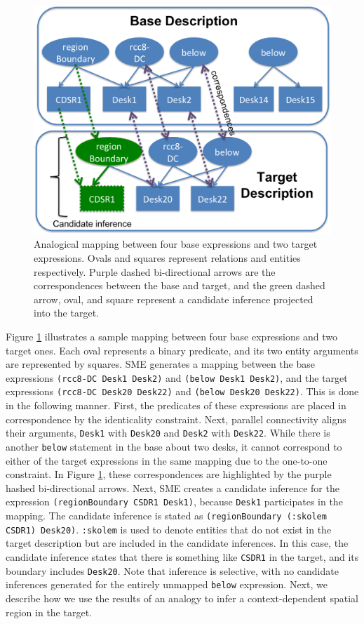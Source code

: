 \documentclass[letterpaper]{article}
\newcommand{\fw}[1]{\texttt{#1}}
\begin{document}
\begin{figure}[h]
  \includegraphics[width=\columnwidth]{analogy2.png}
  \caption{Analogical mapping between four base expressions and two target expressions. Ovals and squares represent relations and entities respectively. Purple dashed bi-directional arrows are the correspondences between the base and target, and the green dashed arrow, oval, and square represent a candidate inference projected into the target.}
  \label{fig:analogy}
\end{figure}

Figure \ref{fig:analogy} illustrates a sample mapping between four base expressions and two target ones. Each oval represents a binary predicate, and its two entity arguments are represented by squares. SME generates a mapping between the base expressions \fw{(rcc8-DC Desk1 Desk2)} and \fw{(below Desk1 Desk2)}, and the  target expressions \fw{(rcc8-DC Desk20 Desk22)} and \fw{(below Desk20 Desk22)}. This is done in the following manner. First, the predicates of these expressions are placed in correspondence by the identicality constraint. Next, parallel connectivity aligns their arguments, \fw{Desk1} with \fw{Desk20} and \fw{Desk2} with \fw{Desk22}. While there is another \fw{below} statement in the base about two desks, it cannot correspond to either of the target expressions in the same mapping due to the one-to-one constraint. In Figure \ref{fig:analogy}, these correspondences are highlighted by the purple hashed bi-directional arrows. Next, SME creates a candidate inference for the expression \fw{(regionBoundary CSDR1 Desk1)}, because \fw{Desk1} participates in the mapping. The candidate inference is stated as \fw{(regionBoundary (:skolem CSDR1) Desk20)}. \fw{:skolem} is used to denote entities that do not exist in the target description but are included in the candidate inferences. In this case, the candidate inference states that there is something like \fw{CSDR1} in the target, and its boundary includes \fw{Desk20}. Note that inference is selective, with no candidate inferences generated for the entirely unmapped \fw{below} expression. Next, we describe how we use the results of an analogy to infer a context-dependent spatial region in the target.
 
\end{document}
